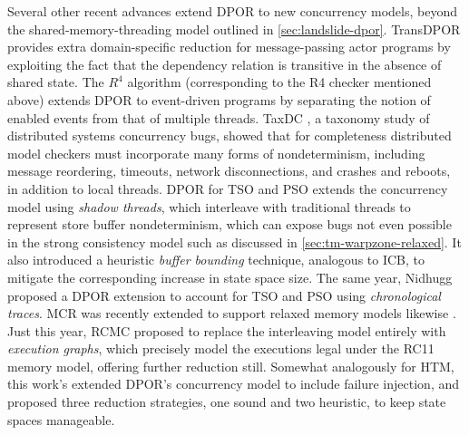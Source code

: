 Several other recent advances extend DPOR to new concurrency models,
beyond the shared-memory-threading model outlined in \cref{sec:landslide-dpor}.
TransDPOR \cite{transdpor} provides extra domain-specific reduction for message-passing actor programs
by exploiting the fact that the dependency relation is transitive in the absence of shared state.
The $R^4$ algorithm \cite{r4} (corresponding to the R4 checker mentioned above)
extends DPOR to event-driven programs by separating the notion of enabled events from that of multiple threads.
TaxDC \cite{taxdc}, a taxonomy study of distributed systems concurrency bugs,
showed that for completeness distributed model checkers must incorporate many forms of nondeterminism,
including message reordering, timeouts, network disconnections, and crashes and reboots, in addition to local threads.
DPOR for TSO and PSO \cite{tsopso}
extends the concurrency model
using {\em shadow threads}, which interleave with traditional threads to represent store buffer nondeterminism,
which can expose bugs not even possible in the strong consistency model
such as discussed in \cref{sec:tm-warpzone-relaxed}.
It also introduced a heuristic {\em buffer bounding} technique, analogous to ICB,
to mitigate the corresponding increase in state space size.
The same year, Nidhugg \cite{nidhugg} proposed a DPOR extension to account for TSO and PSO
using {\em chronological traces}.
MCR was recently extended to support relaxed memory models likewise \cite{mcr-tsopso}.
Just this year, RCMC \cite{rcmc} proposed to replace the interleaving model entirely with {\em execution graphs},
which precisely model the executions legal under the RC11 memory model,
offering further reduction still.
Somewhat analogously for HTM, this work's 
extended DPOR's concurrency model to include failure injection,
and proposed three reduction strategies, one sound and two heuristic,
to keep state spaces manageable.

